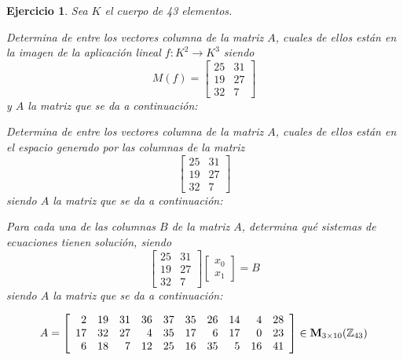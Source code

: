 \documentclass[12pt]{amsart}
\newtheorem{ejer}{Ejercicio}
\begin{document}
\begin{ejer} Sea $K$ el cuerpo de 43 elementos.
\newline
\noindent\begin{minipage}{\textwidth}
\begin{tcolorbox}[colback = green!20!white,title=Versión Núcleo]
Determina de entre los vectores columna de la matriz $A$, cuales de ellos están en la imagen de la aplicación lineal $f:K^{2} \to K^{3}$ siendo  $$ M(f) = \left[\begin{array}{rr}
25 & 31 \\
19 & 27 \\
32 & 7
\end{array}\right] $$ y $A$ la matriz que se da a continuación:\end{tcolorbox}
\end{minipage} \newline
\noindent\begin{minipage}{\textwidth}
\begin{tcolorbox}[colback = blue!20!white,title=Versión Anulador]
Determina de entre los vectores columna de la matriz $A$, cuales de ellos están en el espacio generado por las columnas de la matriz $$ \left[\begin{array}{rr}
25 & 31 \\
19 & 27 \\
32 & 7
\end{array}\right] $$ siendo $A$ la matriz que se da a continuación:\end{tcolorbox}
\end{minipage} \newline
\noindent\begin{minipage}{\textwidth} 
\begin{tcolorbox}[colback = red!20!white,title=Versión Ecuaciones Implícitas]
Para cada una de las columnas $B$ de la matriz $A$, determina qué sistemas de ecuaciones tienen solución, siendo $$ \left[\begin{array}{rr}
25 & 31 \\
19 & 27 \\
32 & 7
\end{array}\right] \left[\begin{array}{r}
x_{0} \\
x_{1}
\end{array}\right] = B$$ siendo $A$ la matriz que se da a continuación:
\end{tcolorbox}
\end{minipage}
\[ A = \left[\begin{array}{rrrrrrrrrr}
2 & 19 & 31 & 36 & 37 & 35 & 26 & 14 & 4 & 28 \\
17 & 32 & 27 & 4 & 35 & 17 & 6 & 17 & 0 & 23 \\
6 & 18 & 7 & 12 & 25 & 16 & 35 & 5 & 16 & 41
\end{array}\right] \in {\bf M}_{3\times 10}({\mathbb Z}_{43})\]
\end{ejer}
\end{document}
